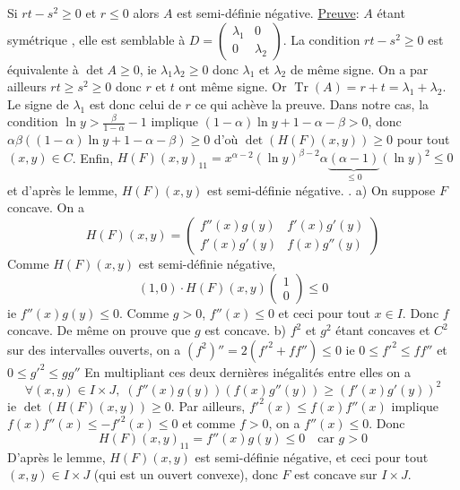 \documentclass{report}
\DeclareMathOperator{\Tr}{Tr}
\begin{document}
Si $rt-s^2\geq 0$ et $r\leq 0$ alors $A$ est semi-définie négative.\newline \newline
\underline{Preuve}: $A$ étant symétrique , elle est semblable à $D=\begin{pmatrix}
\lambda_1 & 0\\
0 & \lambda_2
\end{pmatrix}$. La condition $rt-s^2\geq 0$ est équivalente à $\det A\geq 0$, ie $\lambda_1 \lambda_2\geq 0$ donc $\lambda_1$ et $\lambda_2$ de même signe. On a par ailleurs $rt\geq s^2\geq 0$ donc $r$ et $t$ ont même signe. Or $\Tr(A)=r+t=\lambda_1 + \lambda_2$. Le signe de $\lambda_1$ est donc celui de $r$ ce qui achève la preuve. \newline
\newline
Dans notre cas, la condition $\ln y > \frac{\beta}{1-\alpha}-1$ implique $(1-\alpha)\ln y + 1-\alpha - \beta >0$, donc $\alpha \beta ((1-\alpha)\ln y + 1-\alpha - \beta) \geq 0$ d'où $\det (H(F)(x,y)) \geq 0$ pour tout $(x,y)\in C$.\newline
Enfin, $H(F)(x,y)_{11} = x^{\alpha -2}(\ln y)^{\beta-2}\alpha\underbrace{(\alpha -1)}_{\leq 0}(\ln y)^2\leq 0$ et d'après le lemme, $H(F)(x,y)$ est semi-définie négative. \newline 
{}. a) On suppose $F$ concave. On a $$H(F)(x,y) = \begin{pmatrix}
f''(x)g(y) & f'(x)g'(y) \\
f'(x)g'(y) & f(x)g''(y)
\end{pmatrix}$$
Comme $H(F)(x,y)$ est semi-définie négative, $$(1,0)\cdot H(F)(x,y) \begin{pmatrix}
1 \\0
\end{pmatrix} \leq 0$$
ie $f''(x)g(y)\leq 0$. Comme $g>0$, $f''(x)\leq 0$ et ceci pour tout $x\in I$. Donc $f$ concave.\newline
De même on prouve que $g$ est concave.\newline 
\newline
b) $f^2$ et $g^2$ étant concaves et $C^2$ sur des intervalles ouverts, on a $(f^2)''=2(f'^2+ff'')\leq 0$ ie $0\leq f'^2\leq ff'' $ et $0\leq g'^2\leq gg'' $
En multipliant ces deux dernières inégalités entre elles on a $$\forall(x,y)\in I\times J,\; (f''(x)g(y))(f(x)g''(y))\geq (f'(x)g'(y))^2$$
ie $\det(H(F)(x,y))\geq 0$.\newline
Par ailleurs, $f'^2(x)\leq f(x)f''(x)$ implique $f(x)f''(x)\leq -f'^2(x)\leq 0 $ et comme $f>0$, on a $f''(x)\leq 0$. Donc $$H(F)(x,y)_{11}=f''(x)g(y)\leq 0 \quad \text{car } g>0$$
D'après le lemme, $H(F)(x,y)$ est semi-définie négative, et ceci pour tout $(x,y)\in I\times J$ (qui est un ouvert convexe), donc $F$ est concave sur $I\times J$.
\end{document}
